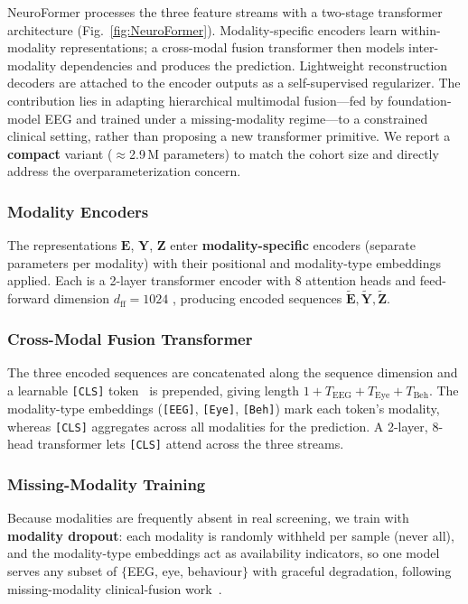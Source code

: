 NeuroFormer processes the three feature streams with a two-stage transformer
architecture (Fig.~\ref{fig:NeuroFormer}). Modality-specific encoders learn
within-modality representations; a cross-modal fusion transformer then models
inter-modality dependencies and produces the prediction. Lightweight reconstruction
decoders are attached to the encoder outputs as a self-supervised regularizer. The
contribution lies in adapting hierarchical multimodal fusion---fed by
foundation-model EEG and trained under a missing-modality regime---to a constrained
clinical setting, rather than proposing a new transformer primitive. We report a
\textbf{compact} variant ($\approx$2.9\,M parameters) to match the cohort size and
directly address the overparameterization concern.

\subsubsection{Modality Encoders}
The representations $\mathbf{E}$, $\mathbf{Y}$, $\mathbf{Z}$ enter
\textbf{modality-specific} encoders (separate parameters per modality) with their
positional and modality-type embeddings applied. Each is a 2-layer transformer
encoder with 8 attention heads and feed-forward dimension $d_{\text{ff}} = 1024$
\cite{Vaswani2017}, producing encoded sequences
$\tilde{\mathbf{E}}, \tilde{\mathbf{Y}}, \tilde{\mathbf{Z}}$.

\subsubsection{Cross-Modal Fusion Transformer}
The three encoded sequences are concatenated along the sequence dimension and a
learnable \texttt{[CLS]} token~\cite{Devlin2019} is prepended, giving length
$1 + T_{\text{EEG}} + T_{\text{Eye}} + T_{\text{Beh}}$. The modality-type embeddings
(\texttt{[EEG]}, \texttt{[Eye]}, \texttt{[Beh]}) mark each token's modality, whereas
\texttt{[CLS]} aggregates across all modalities for the prediction. A 2-layer,
8-head transformer lets \texttt{[CLS]} attend across the three streams.

\subsubsection{Missing-Modality Training}
\label{sec:missing}
Because modalities are frequently absent in real screening, we train with
\textbf{modality dropout}: each modality is randomly withheld per sample (never all),
and the modality-type embeddings act as availability indicators, so one model serves
any subset of $\{$EEG, eye, behaviour$\}$ with graceful degradation, following
missing-modality clinical-fusion work~\cite{DrFuse2024}.

